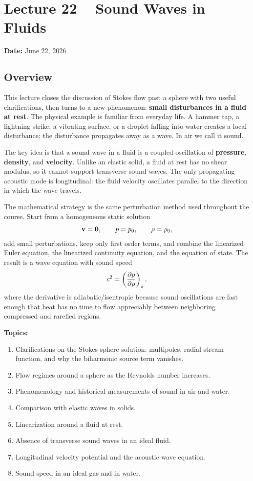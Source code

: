 \documentclass[../main.tex]{subfiles}
\begin{document}
\section{Lecture 22 -- Sound Waves in Fluids}\label{sec:lec22}
\begin{center}
  \textbf{Date:} June 22, 2026
\end{center}

\subsection*{Overview}
This lecture closes the discussion of Stokes flow past a sphere with two useful
clarifications, then turns to a new phenomenon: \textbf{small disturbances in a
fluid at rest}. The physical example is familiar from everyday life. A hammer
tap, a lightning strike, a vibrating surface, or a droplet falling into water
creates a local disturbance; the disturbance propagates away as a wave. In air
we call it sound.

The key idea is that a sound wave in a fluid is a coupled oscillation of
\textbf{pressure}, \textbf{density}, and \textbf{velocity}. Unlike an elastic
solid, a fluid at rest has no shear modulus, so it cannot support transverse
sound waves. The only propagating acoustic mode is longitudinal: the fluid
velocity oscillates parallel to the direction in which the wave travels.

The mathematical strategy is the same perturbation method used throughout the
course. Start from a homogeneous static solution
\[
  \mathbf{v}=\mathbf{0},\qquad p=p_0,\qquad \rho=\rho_0,
\]
add small perturbations, keep only first order terms, and combine the linearized
Euler equation, the linearized continuity equation, and the equation of state.
The result is a wave equation with sound speed
\[
  c^2=\left(\pdv{p}{\rho}\right)_s,
\]
where the derivative is adiabatic/isentropic because sound oscillations are fast
enough that heat has no time to flow appreciably between neighboring compressed
and rarefied regions.

\medskip\noindent\textbf{Topics:}
\begin{enumerate}
  \item Clarifications on the Stokes-sphere solution: multipoles, radial stream
    function, and why the biharmonic source term vanishes.
  \item Flow regimes around a sphere as the Reynolds number increases.
  \item Phenomenology and historical measurements of sound in air and water.
  \item Comparison with elastic waves in solids.
  \item Linearization around a fluid at rest.
  \item Absence of transverse sound waves in an ideal fluid.
  \item Longitudinal velocity potential and the acoustic wave equation.
  \item Sound speed in an ideal gas and in water.
\end{enumerate}
\end{document}

